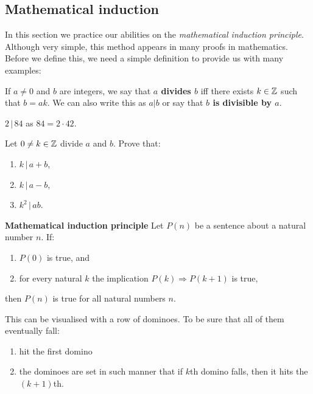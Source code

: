 \subsection{Mathematical induction}
In this section we practice our abilities on the \emph{mathematical induction principle}. Although very simple, this method appears in many proofs in mathematics.
Before we define this, we need a simple definition to provide us with many examples:

\begin{definition}
  If $a\neq 0$ and $b$ are integers, we say that \textbf{$a$ divides $b$} iff there exists $k\in \mathbb Z$ such that $b=ak$. We can also write this as $a|b$ or say that \textbf{$b$ is divisible by $a$}.
\end{definition}

\begin{example}
  $2\,|\,84$ as $84=2\cdot 42$.
\end{example}

\begin{exercise}
  Let $0\neq k\in \mathbb Z$ divide $a$ and $b$. Prove that:
  \begin{enumerate}
    \item $k\,|\,a+b$,
    \item $k\,|\,a-b$,
    \item $k^2\,|\,ab$.
  \end{enumerate}
\end{exercise}

\begin{theorem}
  \textbf{Mathematical induction principle} Let $P(n)$ be a sentence about a natural number $n$. If:
  \begin{enumerate}
    \item $P(0)$ is true, and
    \item for every natural $k$ the implication $P(k)\Rightarrow P(k+1)$ is true,
  \end{enumerate}
  then $P(n)$ is true for all natural numbers $n$.
\end{theorem}

This can be visualised with a row of dominoes. To be sure that all of them eventually fall:
\begin{enumerate}
  \item hit the first domino
  \item the dominoes are set in such manner that if $k$th domino falls, then it hits the $(k+1)$th.
\end{enumerate}

